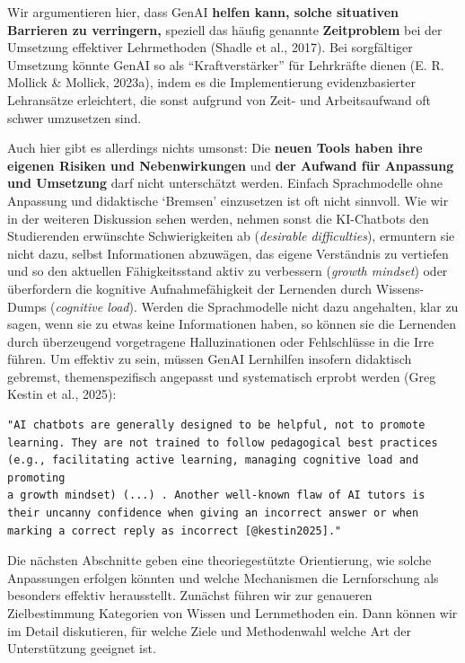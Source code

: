 \documentclass[
  ngerman,
  letterpaper,
  DIV=11]{scrreprt}
\begin{document}
Wir argumentieren hier, dass GenAI \textbf{helfen kann, solche
situativen Barrieren zu verringern,} speziell das häufig genannte
\textbf{Zeitproblem} bei der Umsetzung effektiver Lehrmethoden (Shadle
et al., 2017). Bei sorgfältiger Umsetzung könnte GenAI so als
``Kraftverstärker'' für Lehrkräfte dienen (E. R. Mollick \& Mollick,
2023a), indem es die Implementierung evidenzbasierter Lehransätze
erleichtert, die sonst aufgrund von Zeit- und Arbeitsaufwand oft schwer
umzusetzen sind.

Auch hier gibt es allerdings nichts umsonst: Die \textbf{neuen Tools
haben ihre eigenen Risiken und Nebenwirkungen} und \textbf{der Aufwand
für Anpassung und Umsetzung} darf nicht unterschätzt werden. Einfach
Sprachmodelle ohne Anpassung und didaktische `Bremsen' einzusetzen ist
oft nicht sinnvoll. Wie wir in der weiteren Diskussion sehen werden,
nehmen sonst die KI-Chatbots den Studierenden erwünschte Schwierigkeiten
ab (\emph{desirable difficulties}), ermuntern sie nicht dazu, selbst
Informationen abzuwägen, das eigene Verständnis zu vertiefen und so den
aktuellen Fähigkeitsstand aktiv zu verbessern (\emph{growth mindset})
oder überfordern die kognitive Aufnahmefähigkeit der Lernenden durch
Wissens-Dumps (\emph{cognitive load}). Werden die Sprachmodelle nicht
dazu angehalten, klar zu sagen, wenn sie zu etwas keine Informationen
haben, so können sie die Lernenden durch überzeugend vorgetragene
Halluzinationen oder Fehlschlüsse in die Irre führen. Um effektiv zu
sein, müssen GenAI Lernhilfen insofern didaktisch gebremst,
themenspezifisch angepasst und systematisch erprobt werden (Greg Kestin
et al., 2025):

\begin{verbatim}
"AI chatbots are generally designed to be helpful, not to promote learning. They are not trained to follow pedagogical best practices (e.g., facilitating active learning, managing cognitive load and promoting
a growth mindset) (...) . Another well-known flaw of AI tutors is their uncanny confidence when giving an incorrect answer or when marking a correct reply as incorrect [@kestin2025]."
\end{verbatim}

Die nächsten Abschnitte geben eine theoriegestützte Orientierung, wie
solche Anpassungen erfolgen könnten und welche Mechanismen die
Lernforschung als besonders effektiv herausstellt. Zunächst führen wir
zur genaueren Zielbestimmung Kategorien von Wissen und Lernmethoden ein.
Dann können wir im Detail diskutieren, für welche Ziele und Methodenwahl
welche Art der Unterstützung geeignet ist.
\end{document}
